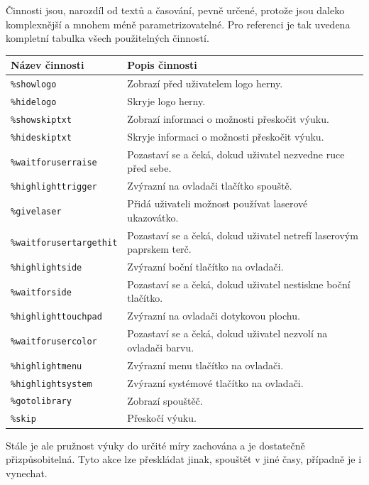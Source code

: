 \newpage

Činnosti jsou, narozdíl od textů a časování, pevně určené, protože jsou
daleko komplexnější a mnohem méně parametrizovatelné. Pro referenci je
tak uvedena kompletní tabulka všech použitelných činností.

\begin{longtabu} to \textwidth {XX}
\toprule

Název činnosti
& 
Popis činnosti
\tabularnewline
\midrule
\endhead
\texttt{\%showlogo}
& 
Zobrazí před uživatelem logo herny.
\tabularnewline

\texttt{\%hidelogo}
& 
Skryje logo herny.
\tabularnewline

\texttt{\%showskiptxt}
& 
Zobrazí informaci o možnosti přeskočit výuku.
\tabularnewline

\texttt{\%hideskiptxt}
& 
Skryje informaci o možnosti přeskočit výuku.
\tabularnewline

\texttt{\%waitforuserraise}
& 
Pozastaví se a čeká, dokud uživatel nezvedne ruce před sebe.
\tabularnewline

\texttt{\%highlighttrigger}
& 
Zvýrazní na ovladači tlačítko spouště.
\tabularnewline

\texttt{\%givelaser}
& 
Přidá uživateli možnost používat laserové ukazovátko.
\tabularnewline

\texttt{\%waitforusertargethit}
& 
Pozastaví se a čeká, dokud uživatel netrefí laserovým paprskem
terč.
\tabularnewline

\texttt{\%highlightside}
& 
Zvýrazní boční tlačítko na ovladači.
\tabularnewline

\texttt{\%waitforside}
& 
Pozastaví se a čeká, dokud uživatel nestiskne boční tlačítko.
\tabularnewline

\texttt{\%highlighttouchpad}
& 
Zvýrazní na ovladači dotykovou plochu.
\tabularnewline

\texttt{\%waitforusercolor}
& 
Pozastaví se a čeká, dokud uživatel nezvolí na ovladači barvu.
\tabularnewline

\texttt{\%highlightmenu}
& 
Zvýrazní menu tlačítko na ovladači.
\tabularnewline

\texttt{\%highlightsystem}
& 
Zvýrazní systémové tlačítko na ovladači.
\tabularnewline

\texttt{\%gotolibrary}
& 
Zobrazí spouštěč.
\tabularnewline

\texttt{\%skip}
& 
Přeskočí výuku.
\tabularnewline
\bottomrule
\end{longtabu}

Stále je ale pružnost výuky do určité míry zachována a je dostatečně
přizpůsobitelná. Tyto akce lze přeskládat jinak, spouštět v jiné časy,
případně je i vynechat.

